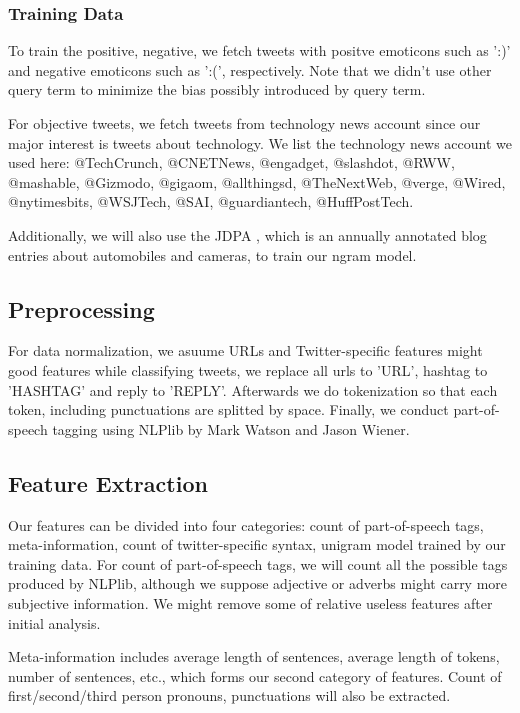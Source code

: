 \documentclass[12pt]{article}
\begin{document}
\subsubsection{Training Data}
To train the positive, negative, we fetch tweets with positve emoticons such as ':)' and negative emoticons such as ':(', respectively. Note that we didn't use other query term to minimize the bias possibly introduced by query term. 

For objective tweets, we fetch tweets from technology news account since our major interest is tweets about technology. We list the technology news account we used here: @TechCrunch, @CNETNews, @engadget, @slashdot, @RWW, @mashable, @Gizmodo, @gigaom, @allthingsd, @TheNextWeb, @verge, @Wired, @nytimesbits, @WSJTech, @SAI, @guardiantech, @HuffPostTech.

Additionally, we will also use the JDPA \cite{JDPA}, which is an annually annotated blog entries about automobiles and cameras, to train our ngram model.

\subsection{Preprocessing}\label{preprocessing}
For data normalization, we asuume URLs and Twitter-specific features might good features while classifying tweets, we replace all urls to 'URL', hashtag to 'HASHTAG' and reply to 'REPLY'. Afterwards we do tokenization so that each token, including punctuations are splitted by space. Finally, we conduct part-of-speech tagging using NLPlib \cite{NLPlib} by Mark Watson and Jason Wiener.

\subsection{Feature Extraction}\label{feature-extraction}
Our features can be divided into four categories: count of part-of-speech tags, meta-information, count of twitter-specific syntax, unigram model trained by our training data. For count of part-of-speech tags, we will count all the possible tags produced by NLPlib, although we suppose adjective or adverbs might carry more subjective information. We might remove some of relative useless features after initial analysis.

Meta-information includes average length of sentences, average length of tokens, number of sentences, etc., which forms our second category of features. Count of first/second/third person pronouns, punctuations will also be extracted.
\end{document}
